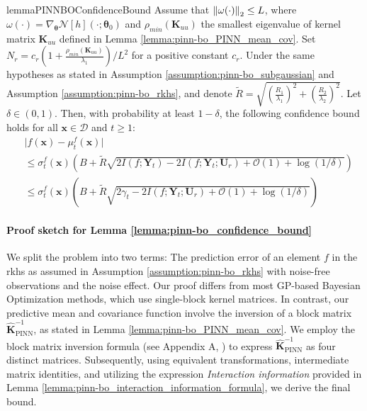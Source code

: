 \begin{restatable}{lemma}{PINNBOConfidenceBound}
\label{lemma:pinn-bo_confidence_bound}
     Assume that $\norm{\omega(\cdot)}_2 \le L$, where $\omega(\cdot)  = \nabla_{\boldsymbol{\theta}} \mathcal{N}[h] (\cdot; \boldsymbol{\theta}_0)$ and $\rho_{min}(\mathbf{K}_{uu})$ the smallest eigenvalue of kernel matrix $\mathbf{K}_{uu}$ defined in Lemma \ref{lemma:pinn-bo_PINN_mean_cov}. Set $N_r = c_r\left(1+ \frac{\rho_{min}(\mathbf{K}_{uu})}{\lambda_1}\right)/L^2$ for a positive constant $c_r$. Under the same hypotheses as stated in Assumption \ref{assumption:pinn-bo_subgaussian} and Assumption \ref{assumption:pinn-bo_rkhs}, and denote $\widetilde{R} = \sqrt{\left(\frac{R_1}{\lambda_1}\right)^2 + \left(\frac{R_2}{\lambda_2}\right)^2}$. Let $\delta \in (0,1)$. Then,  with  probability at least $1 - \delta$, the following confidence bound holds for all $\mathbf{x} \in \mathcal{D}$ and $t \ge 1$:
    \begin{equation*}
    \begin{aligned}
            & \lvert f(\mathbf{x}) - \mu_t^f(\mathbf{x}) \rvert \\
            & \le \sigma_t^f(\mathbf{x}) \left(B +   \widetilde{R}\sqrt{2 I (f; \mathbf{Y}_t) - 2I (f; \mathbf{Y}_t; \mathbf{U}_r) + \mathcal{O}(1) + \log(1/\delta)}  \right) \\
            & \le \sigma_t^f(\mathbf{x}) \left(B +   \widetilde{R}\sqrt{2 \gamma_t - 2I (f; \mathbf{Y}_t; \mathbf{U}_r) + \mathcal{O}(1) + \log(1/\delta)}  \right)
        \end{aligned}
    \end{equation*}
\end{restatable}
\paragraph{Proof sketch for Lemma \ref{lemma:pinn-bo_confidence_bound}}
We split the problem into two terms: The prediction error of an element $f$ in the \ac{rkhs} as assumed in Assumption \ref{assumption:pinn-bo_rkhs} with noise-free observations and the noise effect. Our proof differs from most GP-based Bayesian Optimization methods, which use single-block kernel matrices. In contrast, our predictive mean and covariance function involve the inversion of a block matrix  $\mathbf{\widehat{K}}_\mathrm{PINN}^{-1}$, as stated in Lemma \ref{lemma:pinn-bo_PINN_mean_cov}. We employ the block matrix inversion formula (see Appendix A, \citep{rasmussen2006gaussian}) to express $\mathbf{\widehat{K}}_\mathrm{PINN}^{-1}$ as four distinct matrices. Subsequently, using equivalent transformations, intermediate matrix identities, and utilizing the expression \textit{Interaction information} provided in Lemma \ref{lemma:pinn-bo_interaction_information_formula}, we derive the final bound. 

